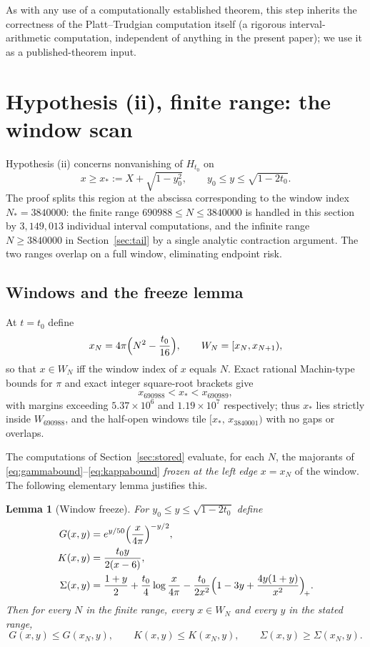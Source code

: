 \documentclass[11pt]{article}
\newtheorem{lemma}[theorem]{Lemma}
\theoremstyle{definition}
\begin{document}
As with any use of a computationally established theorem, this step
inherits the correctness of the Platt--Trudgian computation itself (a
rigorous interval-arithmetic computation, independent of anything in
the present paper); we use it as a published-theorem input.

\section{Hypothesis (ii), finite range: the window scan}\label{sec:finite}

Hypothesis (ii) concerns nonvanishing of $H_{t_0}$ on
\begin{equation}\label{eq:hypiiregion}
x\ge x_*:=X+\sqrt{1-y_0^2},
\qquad
y_0\le y\le\sqrt{1-2t_0}.
\end{equation}
The proof splits this region at the abscissa corresponding to
the window index $N_*=3840000$: the finite range
$690988\le N\le3840000$ is handled in this section by
$3{,}149{,}013$ individual interval computations, and
the infinite range $N\ge3840000$ in Section~\ref{sec:tail} by a
single analytic contraction argument. The two ranges overlap on a
full window, eliminating endpoint risk.

\subsection{Windows and the freeze lemma}\label{sec:freeze}

At $t=t_0$ define
\[
x_N=4\pi\Bigl(N^2-\frac{t_0}{16}\Bigr),
\qquad
W_N=[x_N,x_{N+1}),
\]
so that $x\in W_N$ iff the window index of $x$ equals $N$. Exact
rational Machin-type bounds for $\pi$ and exact integer square-root
brackets give
\begin{equation}\label{eq:xstarwindow}
x_{690988}<x_*<x_{690989},
\end{equation}
with margins exceeding $5.37\times10^6$ and $1.19\times10^7$
respectively; thus $x_*$ lies strictly inside $W_{690988}$, and the
half-open windows tile $[x_*,\,x_{3840001})$ with no gaps or overlaps.

The computations of Section~\ref{sec:stored} evaluate, for each
$N$, the majorants of
\eqref{eq:gammabound}--\eqref{eq:kappabound} \emph{frozen at the
left edge} $x=x_N$ of the window.
The following elementary lemma justifies this.

\begin{lemma}[Window freeze]\label{lem:freeze}
For $y_0\le y\le\sqrt{1-2t_0}$ define
\begin{align*}
G(x,y) &= e^{y/50}\Bigl(\frac{x}{4\pi}\Bigr)^{-y/2},
\\
K(x,y) &= \frac{t_0y}{2(x-6)},
\\
\Sigma(x,y) &= \frac{1+y}{2}+\frac{t_0}{4}\log\frac{x}{4\pi}
-\frac{t_0}{2x^2}\Bigl(1-3y+\frac{4y(1+y)}{x^2}\Bigr)_{\!+}.
\end{align*}
Then for every $N$ in the finite range, every $x\in W_N$ and every $y$
in the stated range,
\[
G(x,y)\le G(x_N,y),\qquad
K(x,y)\le K(x_N,y),\qquad
\Sigma(x,y)\ge\Sigma(x_N,y).
\]
\end{lemma}
\end{document}
